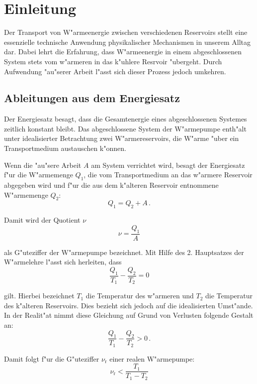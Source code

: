 \section{Einleitung}
\label{sec:einleitung}
	Der Transport von W"armeenergie zwischen verschiedenen Reservoirs stellt eine essenzielle technische Anwendung physikalischer Mechanismen in unserem Alltag dar.
	Dabei lehrt die Erfahrung, dass W"armeenergie in einem abgeschlossenen System stets vom w"armeren in das k"uhlere Resrvoir "ubergeht.
	Durch Aufwendung "au"serer Arbeit l"asst sich dieser Prozess jedoch umkehren.

	\subsection{Ableitungen aus dem Energiesatz}
	\label{subsec:energiesatz}
		Der Energiesatz besagt, dass die Gesamtenergie eines abgeschlossenen Systemes zeitlich konstant bleibt.
		Das abgeschlossene System der W"armepumpe enth"alt unter idealisierter Betrachtung zwei W"armereservoirs, die W"arme "uber ein Transportmedium austauschen k"onnen.

		Wenn die "au"sere Arbeit $A$ am System verrichtet wird, besagt der Energiesatz f"ur die W"armemenge $Q_1$, die vom Transportmedium an das w"armere Reservoir abgegeben wird und f"ur die aus dem k"alteren Reservoir entnommene W"armemenge $Q_2$:
		\begin{equation*}
			Q_1 = Q_2 + A \,.
		\end{equation*}

		Damit wird der Quotient $\nu$
		\begin{equation*}
			\nu = \frac{Q_1}{A}
		\end{equation*}

		als G"uteziffer der W"armepumpe bezeichnet.
		Mit Hilfe des 2. Hauptsatzes der W"armelehre l"asst sich herleiten, dass
		\begin{equation*}
			\frac{Q_1}{T_1} - \frac{Q_2}{T_2} = 0
		\end{equation*}

		gilt.
		Hierbei bezeichnet $T_1$ die Temperatur des w"armeren und $T_2$ die Temperatur des k"alteren Reservoirs.
		Dies bezieht sich jedoch auf die idealisierten Umst"ande. In der Realit"at nimmt diese Gleichung auf Grund von Verlusten folgende Gestalt an:
		\begin{equation}
			\frac{Q_1}{T_1} - \frac{Q_2}{T_2} > 0 \,.
		\end{equation}

		Damit folgt f"ur die G"uteziffer $\nu_\mathrm{r}$ einer realen W"armepumpe:
		\begin{equation}
			\nu_\mathrm{r} < \frac{T_1}{T_1 - T_2} \label{nu_theo}
		\end{equation}

